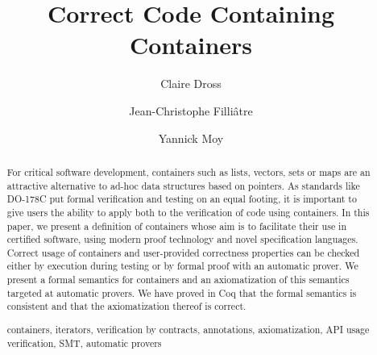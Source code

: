 \documentclass[runningheads,a4paper]{llncs}
\newcommand{\keywords}[1]{\par\addvspace\baselineskip
\noindent\keywordname\enspace\ignorespaces#1}
\begin{document}
\mainmatter  %

\title{Correct Code Containing Containers}


%
%
\author{Claire Dross\and Jean-Christophe Filli\^ atre\and Yannick Moy}


\maketitle

\begin{abstract}

  For critical software development, containers such as lists, vectors, sets or
  maps are an attractive alternative to ad-hoc data structures based on
  pointers. 
  As standards like DO-178C put formal verification and testing on an equal
  footing, it is important to give users the ability to apply both to the
  verification of code using containers.
  In this paper,
  we present a definition of containers whose aim is to facilitate their
  use in certified software, using modern proof technology and novel
  specification languages. Correct usage of containers and user-provided
  correctness properties can be checked either by execution during testing
  or by formal proof with an automatic prover.
  We present a formal semantics for containers and an axiomatization of this 
  semantics targeted at automatic provers. We have proved in Coq that the
  formal semantics is consistent and that the axiomatization thereof is correct.

  \keywords{containers, iterators, verification by contracts, annotations,
    axiomatization, API usage verification, SMT, automatic provers}
\end{abstract}
\end{document}
